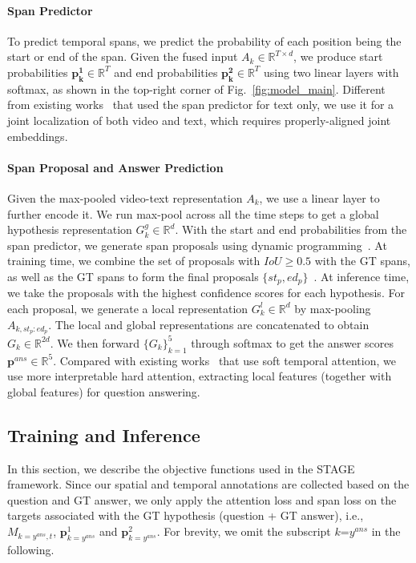\documentclass[11pt,a4paper]{article}
\begin{document}
\paragraph{Span Predictor} 
To predict temporal spans, we predict the probability of each position being the start or end of the span. 
Given the fused input $A_{k} \in \mathbb{R}^{T \times d}$, we produce start probabilities $\mathbf{p_{k}^1} \in \mathbb{R}^T$ and end probabilities $\mathbf{p_{k}^2} \in \mathbb{R}^T$  using two linear layers with softmax, as shown in the top-right corner of Fig.~\ref{fig:model_main}. Different from existing works~\cite{Seo2017BidirectionalAF,Yu2018QANetCL} that used the span predictor for text only, we use it for a joint localization of both video and text, which requires properly-aligned joint embeddings.

\paragraph{Span Proposal and Answer Prediction} 
Given the max-pooled video-text representation $A_{k}$, we use a linear layer to further encode it. 
We run max-pool across all the time steps to get a global hypothesis representation $G_{k}^{g} \in \mathbb{R}^d$. 
With the start and end probabilities from the span predictor, we generate span proposals using dynamic programming~\cite{Seo2017BidirectionalAF}. 
At training time, we combine the set of proposals with $\mathit{IoU} \geq 0.5$ with the GT spans, as well as the GT spans to form the final proposals $\{st_{p}, ed_{p}\}$~\cite{Ren2015FasterRT}. 
At inference time, we take the proposals with the highest confidence scores for each hypothesis. 
For each proposal, we generate a local representation $G_{k}^{l} \in \mathbb{R}^d$ by max-pooling $A_{k, st_p:ed_p}$. 
The local and global representations are concatenated to obtain $G_k \in \mathbb{R}^{2d}$. 
We then forward $\{G_k\}_{k=1}^5$ through softmax to get the answer scores $\mathbf{p}^\mathit{ans} \in \mathbb{R}^5$. 
Compared with existing works~\cite{Jang2017TGIFQATS,Zhao2017VideoQA} that use soft temporal attention, we use more interpretable hard attention, extracting local features (together with global features) for question answering.


\subsection{Training and Inference}\label{training_inference}
    
In this section, we describe the objective functions used in the STAGE framework. 
Since our spatial and temporal annotations are collected based on the question and GT answer, we only apply the attention loss and span loss on the targets associated with the GT hypothesis (question + GT answer), i.e., $M_{k=y^\mathit{ans},t}$, $\mathbf{p}^1_{k=y^\mathit{ans}}$ and $\mathbf{p}^2_{k=y^\mathit{ans}}$. 
For brevity, we omit the subscript $k\text{=}y^\mathit{ans}$ in the following. 
\end{document}
